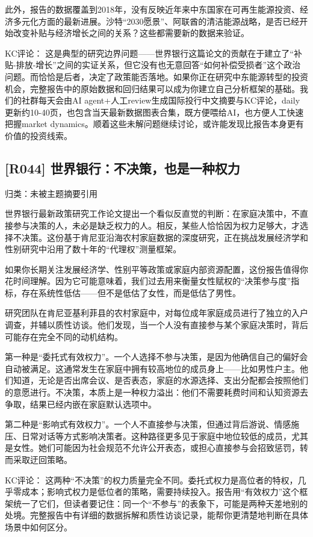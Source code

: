 \documentclass[11pt]{ctexart}
\begin{document}
此外，报告的数据覆盖到2018年，没有反映近年来中东国家在可再生能源投资、经济多元化方面的最新进展。沙特“2030愿景”、阿联酋的清洁能源战略，是否已经开始改变补贴与经济增长之间的关系？这些都需要新的数据来验证。

KC评论： 这是典型的研究边界问题——世界银行这篇论文的贡献在于建立了“补贴-排放-增长”之间的实证关系，但它没有也无意回答“如何补偿受损者”这个政治问题。而恰恰是后者，决定了政策能否落地。如果你正在研究中东能源转型的投资机会，完整报告中的原始数据和回归结果可以成为你建立自己分析框架的基础。我们的社群每天会由AI agent+人工review生成国际投行中文摘要与KC评论，daily更新约10-40页，也包含当天最新数据图表合集，既方便喂给AI，也方便人工快速把握market dynamics。顺着这些未解问题继续讨论，或许能发现比报告本身更有价值的投资线索。

\subsection{[R044] 世界银行：不决策，也是一种权力}
{\small\color{refgray}归类：未被主题摘要引用}

世界银行最新政策研究工作论文提出一个看似反直觉的判断：在家庭决策中，不直接参与决策的人，未必是缺乏权力的人。相反，某些人恰恰因为权力足够大，才选择不决策。这份基于肯尼亚沿海农村家庭数据的深度研究，正在挑战发展经济学和性别研究中沿用了数十年的“代理权”测量框架。

如果你长期关注发展经济学、性别平等政策或家庭内部资源配置，这份报告值得你花时间理解。因为它可能意味着，我们过去用来衡量女性赋权的“决策参与度”指标，存在系统性低估——但不是低估了女性，而是低估了男性。

研究团队在肯尼亚基利菲县的农村家庭中，对每位成年家庭成员进行了独立的入户调查，并辅以质性访谈。他们发现，当一个人没有直接参与某个家庭决策时，背后可能存在完全不同的动机结构。

第一种是“委托式有效权力”。一个人选择不参与决策，是因为他确信自己的偏好会自动被满足。这通常发生在家庭中拥有较高地位的成员身上——比如男性户主。他们知道，无论是否出席会议、是否表态，家庭的水源选择、支出分配都会按照他们的意愿进行。不决策，本质上是一种权力溢出：他们不需要耗费时间和认知资源去争取，结果已经内嵌在家庭默认选项中。

第二种是“影响式有效权力”。一个人不直接参与决策，但通过背后游说、情感施压、日常对话等方式影响决策者。这种路径更多见于家庭中地位较低的成员，尤其是女性。她们可能因为社会规范不允许公开表态，或担心直接参与会招致惩罚，转而采取迂回策略。

KC评论： 这两种“不决策”的权力质量完全不同。委托式权力是高位者的特权，几乎零成本；影响式权力是低位者的策略，需要持续投入。报告用“有效权力”这个框架统一了它们，但读者要记住：同一个“不参与”的表象下，可能是两种天差地别的处境。完整报告中有详细的数据拆解和质性访谈记录，能帮你更清楚地判断在具体场景中如何区分。
\end{document}
